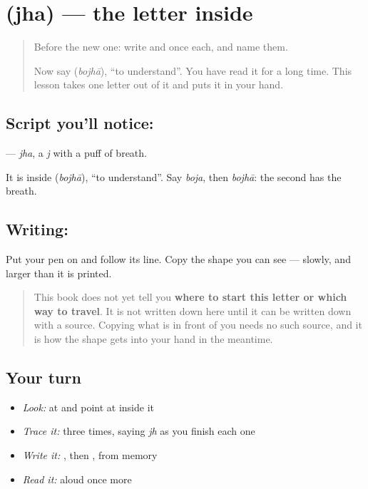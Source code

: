 \section[\texorpdfstring{\bn{ঝ} (jha)}{ঝ (jha)}]{ (jha) — the letter inside }

\label{lesson:BN-W41-jha}



\begin{quote}
Before the new one: write  and  once each, and name them.

Now say \textbf{} (\emph{bojhā}), \textquotedblleft{}to understand\textquotedblright{}. You have read it for a long time. This lesson takes one letter out of it and puts it in your hand.
\end{quote}

\subsection*{Script you'll notice: }
\textbf{} — \emph{jha}, a \emph{j} with a puff of breath.

It is inside \textbf{} (\emph{bojhā}), \textquotedblleft{}to understand\textquotedblright{}. Say \emph{boja}, then \emph{bojhā}: the second has the breath.

\subsection*{Writing: }
Put your pen on  and follow its line. Copy the shape you can see — slowly, and larger than it is printed.

\begin{quote}
This book does not yet tell you \textbf{where to start this letter or which way to travel}. It is not written down here until it can be written down with a source. Copying what is in front of you needs no such source, and it is how the shape gets into your hand in the meantime.
\end{quote}

\subsection*{Your turn}
\begin{itemize}
\raggedright
  \item \emph{Look:} at \textbf{} and point at  inside it
  \item \emph{Trace it:}  three times, saying \emph{jh} as you finish each one
  \item \emph{Write it:} , then , from memory
  \item \emph{Read it:} \textbf{} aloud once more
\end{itemize}

